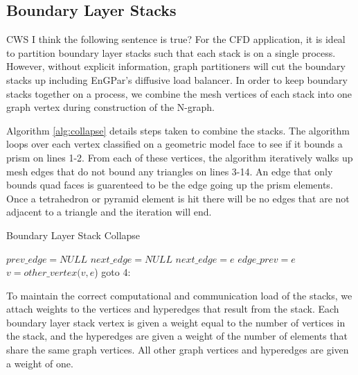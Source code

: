 \documentclass[conference]{IEEEtran}
\begin{document}
\subsection{Boundary Layer Stacks}

{\color{red} CWS I think the following sentence is true?}
For the CFD application, it is ideal to partition boundary layer stacks such that each stack
is on a single process. However, without explicit information, graph partitioners will cut
the boundary stacks up including EnGPar's diffusive load balancer. In order to keep boundary
stacks together on a process, we combine the mesh vertices of each stack into one graph vertex
during construction of the N-graph.

Algorithm \ref{alg:collapse} details steps taken to
combine the stacks. The algorithm loops over each vertex classified on a geometric
model face to see if it bounds a prism on lines 1-2. From each of these vertices, the
algorithm iteratively walks up mesh edges that do not bound any triangles on lines 3-14. An edge
that only bounds quad faces is guarenteed to be the edge going up the prism elements. Once
a tetrahedron or pyramid element is hit there will be no edges that are not adjacent to a triangle
and the iteration will end.
\begin{algorithm}
  \caption{Boundary Layer Stack Collapse}
  \label{alg:collapse}
  \small
  \begin{algorithmic}[1]
    \State $prev\_edge = NULL$
    \State $next\_edge = NULL$
    \State $next\_edge = e$
    \EndIf
    \EndFor
    \State $edge\_prev = e$
    \State $v = other\_vertex(v,e$)
    \State goto 4:
    \EndIf
    \EndIf
    \EndFor
  \end{algorithmic}
\end{algorithm}

To maintain the correct computational and communication load of the stacks,
we attach weights to the vertices and hyperedges that result from the stack. Each boundary layer
stack vertex is given a weight equal to the number of vertices in the stack, and the hyperedges
are given a weight of the number of elements that share the same graph vertices. All other
graph vertices and hyperedges are given a weight of one.
\end{document}
